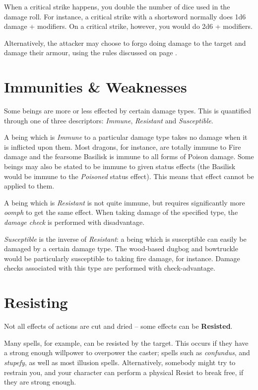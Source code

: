 When a critical strike happens, you double the number of dice used in the damage roll. For instance, a critical strike with a shortsword normally does 1d6 damage + modifiers. On a critical strike, however, you would do 2d6 + modifiers. 

Alternatively, the attacker may choose to forgo doing damage to the target and damage their armour, using the rules discussed on page \pageref{S:DestroyArmour}.

\section{Immunities \& Weaknesses}

Some beings are more or less effected by certain damage types. This is quantified through one of three descriptors: {\it Immune}, {\it Resistant} and {\it Susceptible}. 

A being which is {\it Immune} to a particular damage type takes no damage when it is inflicted upon them. Most dragons, for instance, are totally immune to Fire damage and the fearsome Basilisk is immune to all forms of Poison damage. Some beings may also be stated to be immune to given status effects (the Basilisk would be immune to the {\it Poisoned} status effect). This means that effect cannot be applied to them. 

A being which is {\it Resistant} is not quite immune, but requires significantly more {\it oomph} to get the same effect. When taking damage of the specified type, the {\it damage check} is performed with disadvantage. 

{\it Susceptible} is the inverse of {\it Resistant}: a being which is susceptible can easily be damaged by a certain damage type. The wood-based dugbog and bowtruckle would be particularly susceptible to taking fire damage, for instance. Damage checks associated with this type are performed with check-advantage. 

\section{Resisting}

Not all effects of actions are cut and dried -- some effects can be {\bf Resisted}. 

Many spells, for example, can be resisted by the target. This occurs if they have a strong enough willpower to overpower the caster; spells such as {\it confundus}, and {\it stupefy}, as well as most illusion spells. Alternatively, somebody might try to restrain you, and your character can perform a physical Resist to break free, if they are strong enough. 

